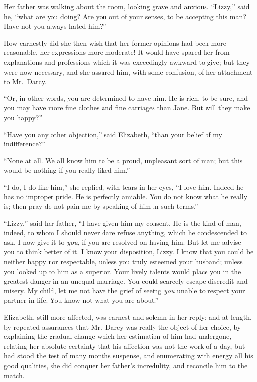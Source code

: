 Her father was walking about the room, looking grave and
anxious.  ``Lizzy,'' said he, ``what are you doing?  Are you out
of your senses, to be accepting this man?  Have not you always
hated him?''

How earnestly did she then wish that her former opinions had
been more reasonable, her expressions more moderate!  It would
have spared her from explanations and professions which it was
exceedingly awkward to give; but they were now necessary, and
she assured him, with some confusion, of her attachment to
Mr.\ Darcy.

``Or, in other words, you are determined to have him.  He is
rich, to be sure, and you may have more fine clothes and fine
carriages than Jane.  But will they make you happy?''

``Have you any other objection,'' said Elizabeth, ``than your
belief of my indifference?''

``None at all.  We all know him to be a proud, unpleasant sort
of man; but this would be nothing if you really liked him.''

``I do, I do like him,'' she replied, with tears in her eyes,
``I love him.  Indeed he has no improper pride.  He is perfectly
amiable.  You do not know what he really is; then pray do not
pain me by speaking of him in such terms.''

``Lizzy,'' said her father, ``I have given him my consent.
He is the kind of man, indeed, to whom I should never dare
refuse anything, which he condescended to ask.  I now give it
to \emph{you}, if you are resolved on having him.  But let me advise
you to think better of it.  I know your disposition, Lizzy.
I know that you could be neither happy nor respectable, unless
you truly esteemed your husband; unless you looked up to him
as a superior.  Your lively talents would place you in the
greatest danger in an unequal marriage.  You could scarcely
escape discredit and misery.  My child, let me not have the
grief of seeing \emph{you} unable to respect your partner in life.
You know not what you are about.''

Elizabeth, still more affected, was earnest and solemn in her
reply; and at length, by repeated assurances that Mr.\ Darcy was
really the object of her choice, by explaining the gradual
change which her estimation of him had undergone, relating her
absolute certainty that his affection was not the work of a
day, but had stood the test of many months suspense, and
enumerating with energy all his good qualities, she did conquer
her father's incredulity, and reconcile him to the match.

